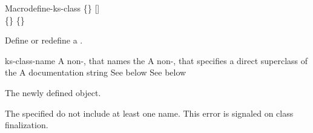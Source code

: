 \documentclass[10pt,twoside,english,pdftex]{article}
\begin{document}

\begin{functiondoc}{Macro}{define-ks-class}%
   { 
   \code{(}\{\}\superstar\code{)}
   [] \\
   \code{(}\{\}\superstar\code{)}
   \{\}\superstar{}
   \returns{} }
%
%
%

\fnsyntax

\fnpurpose Define or redefine a .

\fnpackage {}

\fnmodule {}

\fnargs
\begin{args}{ks-class-name}
 A non-\nil,  that names the
 A non-\nil,  that specifies a
direct superclass of the    
\arg[documentation] A documentation string
 See below
 See below
\end{args}

\fnreturns The newly defined  object.

\fnerrors The specified  do not include at least
one  name.  This error is signaled on class finalization.


\end{functiondoc}
\end{document}

